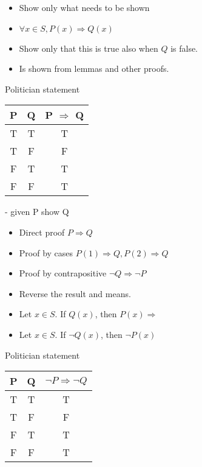 \documentclass[english,10pt,a4paper]{article}
\begin{document}
\begin{theo} 
\begin{minipage}{0.75\linewidth}
\begin{itemize}
\item Show only what needs to be shown
\item $\forall x \in S, P(x) \Rightarrow Q(x)$
\item[] Show only that this is true also when $Q$ is false.
\item Is shown from lemmas and other proofs.
\end{itemize}
\end{minipage}
\hspace{0.1cm}
\begin{minipage}{0.2\linewidth}
Politician statement
\begin{tabular}{cc|c}
P & Q & P $\Rightarrow$ Q\\ 
\hline
T & T & T \\ 
T & F & F\\
F & T & T\\
F & F & T
\end{tabular} 

\end{minipage}
\end{theo}



\begin{theo}[Deduction]  
- given P show Q
\begin{itemize}
\item Direct proof $P \Rightarrow Q$
\item Proof by cases $P(1) \Rightarrow Q, P(2) \Rightarrow Q$
\item Proof by contrapositive $\neg Q \Rightarrow \neg P$
\end{itemize}
\end{theo}


\begin{theo} 
\begin{minipage}{0.75\linewidth}
\begin{itemize}
\item Reverse the result and means.
\item Let $x \in S$. If $Q(x)$, then $P(x) \Rightarrow$
\item[] Let $x \in S$. If $\neg Q(x)$, then $\neg P(x)$
\end{itemize}
\end{minipage}
\hspace{0.1cm}
\begin{minipage}{0.2\linewidth}
Politician statement
\begin{tabular}{cc|c}
P & Q & $\neg P \Rightarrow \neg Q$\\ 
\hline
T & T & T \\ 
T & F & F\\
F & T & T\\
F & F & T
\end{tabular} 

\end{minipage}
\end{theo}
\end{document}
